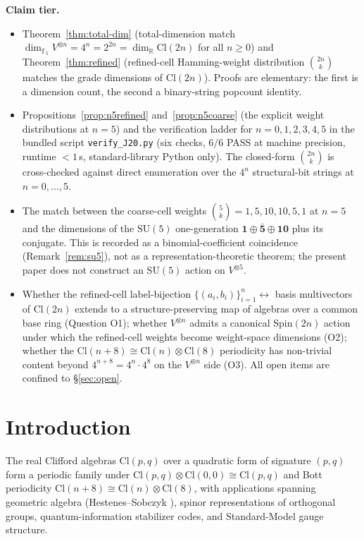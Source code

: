 \documentclass[11pt,reqno]{amsart}
\theoremstyle{plain}
\theoremstyle{definition}
\theoremstyle{remark}
\newcommand{\F}{\mathbb{F}}
\newcommand{\R}{\mathbb{R}}
\newcommand{\Cl}{\mathrm{Cl}}
\begin{document}
\medskip
\noindent\textbf{Claim tier.}
\begin{itemize}
\item[\textbf{PROVED.}]
Theorem~\ref{thm:total-dim} (total-dimension match
$\dim_{\F_5} V^{\otimes n} = 4^n = 2^{2n} = \dim_\R \Cl(2n)$ for all
$n \geq 0$) and Theorem~\ref{thm:refined} (refined-cell Hamming-weight
distribution $\binom{2n}{k}$ matches the grade dimensions of $\Cl(2n)$).
Proofs are elementary: the first is a dimension count, the second a
binary-string popcount identity.
\item[\textbf{COMPUTED.}]
Propositions~\ref{prop:n5refined} and~\ref{prop:n5coarse} (the explicit
weight distributions at $n = 5$) and the verification ladder for
$n = 0, 1, 2, 3, 4, 5$ in the bundled script \texttt{verify\_J20.py}
(six checks, $6/6$ PASS at machine precision, runtime $< 1$\,s,
standard-library Python only). The closed-form $\binom{2n}{k}$ is
cross-checked against direct enumeration over the $4^n$ structural-bit
strings at $n = 0, \ldots, 5$.
\item[\textbf{STRUCTURAL RHYME.}]
The match between the coarse-cell weights $\binom{5}{k} =
1, 5, 10, 10, 5, 1$ at $n=5$ and the dimensions of the $\mathrm{SU}(5)$
one-generation $\mathbf{1} \oplus \bar{\mathbf{5}} \oplus \mathbf{10}$
plus its conjugate.  This is recorded as a binomial-coefficient
coincidence (Remark~\ref{rem:su5}), not as a representation-theoretic
theorem; the present paper does not construct an $\mathrm{SU}(5)$
action on $V^{\otimes 5}$.
\item[\textbf{OPEN.}]
Whether the refined-cell label-bijection
$\{(a_i, b_i)\}_{i=1}^n \leftrightarrow$ basis multivectors of $\Cl(2n)$
extends to a structure-preserving map of algebras over a common base
ring (Question O1); whether $V^{\otimes n}$ admits a canonical
$\mathrm{Spin}(2n)$ action under which the refined-cell weights become
weight-space dimensions (O2); whether the $\Cl(n+8) \cong \Cl(n)
\otimes \Cl(8)$ periodicity has non-trivial content beyond
$4^{n+8} = 4^n \cdot 4^8$ on the $V^{\otimes n}$ side (O3). All open
items are confined to \S\ref{sec:open}.
\end{itemize}

\section{Introduction}

The real Clifford algebras $\Cl(p, q)$ over a quadratic form of
signature $(p, q)$ form a periodic family under
$\Cl(p, q) \otimes \Cl(0, 0) \cong \Cl(p, q)$ and Bott periodicity
$\Cl(n + 8) \cong \Cl(n) \otimes \Cl(8)$, with applications spanning
geometric algebra (Hestenes--Sobczyk \cite{HesteneSobczyk1984}),
spinor representations of orthogonal groups, quantum-information
stabilizer codes, and Standard-Model gauge structure.
\end{document}
